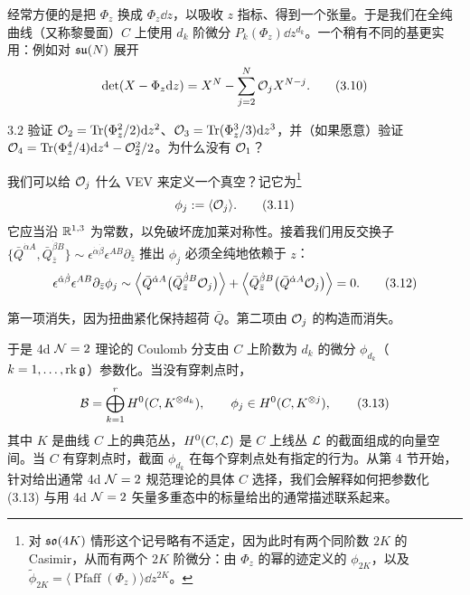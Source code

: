 经常方便的是把 $\Phi_z$ 换成 $\Phi_z\dd z$，以吸收 $z$ 指标、得到一个张量。于是我们在全纯曲线（又称黎曼面）$C$ 上使用 $d_k$ 阶微分 $P_k(\Phi_z)\dd z^{d_k}$。一个稍有不同的基更实用：例如对 $\mathfrak{su}(N)$ 展开
\begin{equation}
\det(X-\Phi_z\mathrm{d} z) = X^N - \sum_{j=2}^{N}\mathcal{O}_j X^{N-j} .
\tag{3.10}
\end{equation}

\begin{exercise}{3.2}
验证 $\mathcal{O}_2=\operatorname{Tr}(\Phi^2_z/2)\mathrm{d} z^2$、$\mathcal{O}_3=\operatorname{Tr}(\Phi^3_z/3)\mathrm{d} z^3$，并（如果愿意）验证 $\mathcal{O}_4=\operatorname{Tr}(\Phi^4_z/4)\mathrm{d} z^4-\mathcal{O}_2^2/2$。为什么没有 $\mathcal{O}_1$？
\end{exercise}


我们可以给 $\mathcal{O}_j$ 什么 VEV 来定义一个真空？记它为\footnote{对 $\mathfrak{so}(4K)$ 情形这个记号略有不适定，因为此时有两个同阶数 $2K$ 的 Casimir，从而有两个 $2K$ 阶微分：由 $\Phi_z$ 的幂的迹定义的 $\phi_{2K}$，以及 $\tilde\phi_{2K}=\langle\operatorname{Pfaff}(\Phi_z)\rangle\dd z^{2K}$。}
\begin{equation}
\phi_j := \langle\mathcal{O}_j\rangle .
\tag{3.11}
\end{equation}
它应当沿 $\mathbb{R}^{1,3}$ 为常数，以免破坏庞加莱对称性。接着我们用反交换子 $\{\bar Q^{\dot\alpha A},\bar Q^{\dot\beta B}_{\bar z}\}\sim\epsilon^{\dot\alpha\dot\beta}\epsilon^{AB}\partial_{\bar z}$ 推出 $\phi_j$ 必须全纯地依赖于 $z$：
\begin{equation}
\epsilon^{\dot\alpha\dot\beta}\epsilon^{AB}\partial_{\bar z}\phi_j \sim \Big\langle \bar Q^{\dot\alpha A}\big(\bar Q^{\dot\beta B}_{\bar z}\mathcal{O}_j\big)\Big\rangle + \Big\langle \bar Q^{\dot\beta B}_{\bar z}\big(\bar Q^{\dot\alpha A}\mathcal{O}_j\big)\Big\rangle = 0 .
\tag{3.12}
\end{equation}

第一项消失，因为扭曲紧化保持超荷 $\bar Q$。第二项由 $\mathcal{O}_j$ 的构造而消失。

于是 4d $\mathcal{N}=2$ 理论的 Coulomb 分支由 $C$ 上阶数为 $d_k$ 的微分 $\phi_{d_k}$（$k=1,\dots,\operatorname{rk}\mathfrak{g}$）参数化。当没有穿刺点时，
\begin{equation}
\mathcal{B} = \bigoplus_{k=1}^{r} H^0(C, K^{\otimes d_k}) ,\qquad \phi_j\in H^0(C, K^{\otimes j}) ,
\tag{3.13}
\end{equation}
其中 $K$ 是曲线 $C$ 上的典范丛，$H^0(C,\mathcal{L})$ 是 $C$ 上线丛 $\mathcal{L}$ 的截面组成的向量空间。当 $C$ 有穿刺点时，截面 $\phi_{d_k}$ 在每个穿刺点处有指定的行为。从第 4 节开始，针对给出通常 4d $\mathcal{N}=2$ 规范理论的具体 $C$ 选择，我们会解释如何把参数化 (3.13) 与用 4d $\mathcal{N}=2$ 矢量多重态中的标量给出的通常描述联系起来。

